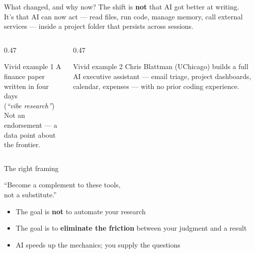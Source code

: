 \documentclass[aspectratio=169, 10pt]{beamer}
\begin{document}
\begin{frame}{What changed, and why now?}
  The shift is \textbf{not} that AI got better at writing.\\[0.6em]

  It's that AI can now \alert{act} --- read files, run code, manage memory,
  call external services --- inside a project folder that persists across sessions.

  \vspace{0.8em}
  \begin{columns}[T]
    \begin{column}{0.47\textwidth}
      \begin{block}{Vivid example 1}
        A finance paper written in four days\\
        (\textit{``vibe research''})\\[0.2em]
        \small Not an endorsement --- a data point about the frontier.
      \end{block}
    \end{column}
    \begin{column}{0.47\textwidth}
      \begin{block}{Vivid example 2}
        Chris Blattman (UChicago) builds a full AI executive assistant ---
        email triage, project dashboards, calendar, expenses ---
        with no prior coding experience.
      \end{block}
    \end{column}
  \end{columns}
\end{frame}

\begin{frame}{The right framing}
  \vspace{1em}
  \begin{center}
    {\Large ``Become a \alert{complement} to these tools,\\
    not a substitute.''}
  \end{center}
  \vspace{1em}
  \begin{itemize}
    \item The goal is \textbf{not} to automate your research
    \item The goal is to \textbf{eliminate the friction} between your judgment
          and a result
    \item AI speeds up the mechanics; you supply the questions
  \end{itemize}
\end{frame}
\end{document}
